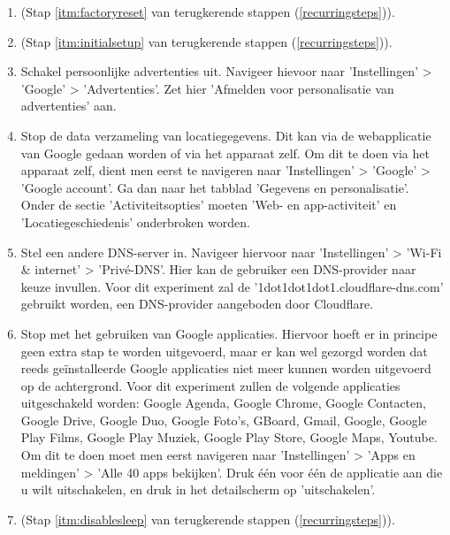 \begin{enumerate}
    \item 
     (Stap \ref{itm:factoryreset} van terugkerende stappen (\ref{recurringsteps})).
    
    \item 
     (Stap \ref{itm:initialsetup} van terugkerende stappen (\ref{recurringsteps})).
    
    \item Schakel persoonlijke advertenties uit. Navigeer hievoor naar 'Instellingen' > 'Google' > 'Advertenties'. Zet hier 'Afmelden voor personalisatie van advertenties' aan.
    
    \item Stop de data verzameling van locatiegegevens. Dit kan via de webapplicatie van Google gedaan worden of via het apparaat zelf. Om dit te doen via het apparaat zelf, dient men eerst te navigeren naar 'Instellingen' > 'Google' > 'Google account'. Ga dan naar het tabblad 'Gegevens en personalisatie'. Onder de sectie 'Activiteitsopties' moeten 'Web- en app-activiteit' en 'Locatiegeschiedenis' onderbroken worden.
    
    \item Stel een andere DNS-server in. Navigeer hiervoor naar 'Instellingen' > 'Wi-Fi \& internet' > 'Privé-DNS'. Hier kan de gebruiker een DNS-provider naar keuze invullen. Voor dit experiment zal de '1dot1dot1dot1.cloudflare-dns.com' gebruikt worden, een DNS-provider aangeboden door Cloudflare.
    
    \item Stop met het gebruiken van Google applicaties. Hiervoor hoeft er in principe geen extra stap te worden uitgevoerd, maar er kan wel gezorgd worden dat reeds geïnstalleerde Google applicaties niet meer kunnen worden uitgevoerd op de achtergrond. Voor dit experiment zullen de volgende applicaties uitgeschakeld worden: Google Agenda, Google Chrome, Google Contacten, Google Drive, Google Duo, Google Foto's, GBoard, Gmail, Google, Google Play Films, Google Play Muziek, Google Play Store, Google Maps, Youtube. Om dit te doen moet men eerst navigeren naar 'Instellingen' > 'Apps en meldingen' > 'Alle 40 apps bekijken'. Druk één voor één de applicatie aan die u wilt uitschakelen, en druk in het detailscherm op 'uitschakelen'.
    
    \item 
     (Stap \ref{itm:disablesleep} van terugkerende stappen (\ref{recurringsteps})).
\end{enumerate}
    
